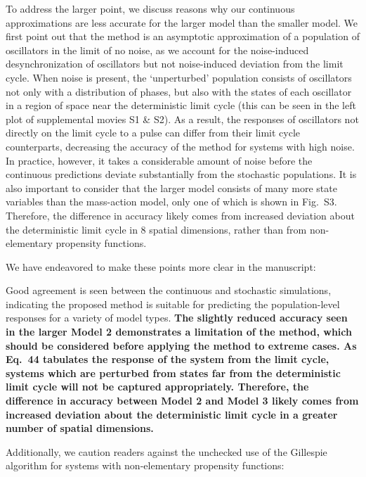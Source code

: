 \documentclass[11pt, letterpaper]{article}
\newenvironment{manuscript}[1]{\begin{center}\begin{tcolorbox}[colback=green!5!white,colframe=green!75!black,width=0.8\textwidth,title={#1},breakable,fonttitle=\bfseries]}{\end{tcolorbox}\end{center}}
\begin{document}
To address the larger point, we discuss reasons why our continuous approximations are less accurate for the larger model than the smaller model. 
We first point out that the method is an asymptotic approximation of a population of oscillators in the limit of no noise, as we account for the noise-induced desynchronization of oscillators but not noise-induced deviation from the limit cycle.
When noise is present, the `unperturbed' population consists of oscillators not only with a distribution of phases, but also with the states of each oscillator in a region of space near the deterministic limit cycle (this can be seen in the left plot of supplemental movies S1 \& S2).
As a result, the responses of oscillators not directly on the limit cycle to a pulse can differ from their limit cycle counterparts, decreasing the accuracy of the method for systems with high noise.
In practice, however, it takes a considerable amount of noise before the continuous predictions deviate substantially from the stochastic populations.
It is also important to consider that the larger model consists of many more state variables than the mass-action model, only one of which is shown in Fig.~S3.
Therefore, the difference in accuracy likely comes from increased deviation about the deterministic limit cycle in 8 spatial dimensions, rather than from non-elementary propensity functions.

We have endeavored to make these points more clear in the manuscript:

\begin{manuscript}{Supplemental Info, Page 6}
Good agreement is seen between the continuous and stochastic simulations, indicating the proposed method is suitable for predicting the population-level responses for a variety of model types.
{\bfseries The slightly reduced accuracy seen in the larger Model 2 demonstrates a limitation of the method, which should be considered before applying the method to extreme cases.
As Eq.~44 tabulates the response of the system from the limit cycle, systems which are perturbed from states far from the deterministic limit cycle will not be captured appropriately.
Therefore, the difference in accuracy between Model 2 and Model 3 likely comes from increased deviation about the deterministic limit cycle in a greater number of spatial dimensions.}
\end{manuscript}

Additionally, we caution readers against the unchecked use of the Gillespie algorithm for systems with non-elementary propensity functions:
\end{document}
